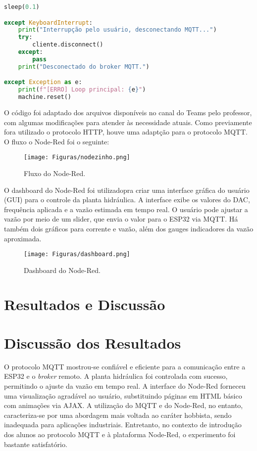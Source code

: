 \documentclass[a4paper,12pt]{article}
\begin{document}
\begin{lstlisting}[language=Python, caption={Código Principal do ESP32}, label={lst:codigoESP32}]
        sleep(0.1)

except KeyboardInterrupt:
    print("Interrupção pelo usuário, desconectando MQTT...")
    try:
        cliente.disconnect()
    except:
        pass
    print("Desconectado do broker MQTT.")

except Exception as e:
    print(f"[ERRO] Loop principal: {e}")
    machine.reset()
\end{lstlisting}

\newpage

O código foi adaptado dos arquivos disponíveis no canal do Teams pelo professor, com algumas modificações para atender às necessidade atuais. Como previamente fora utilizado o protocolo HTTP, houve uma adaptção para o protocolo MQTT. O fluxo o Node-Red foi o seguinte:
\begin{figure}
    \centering
    \texttt{[image: Figuras/nodezinho.png]}
    \caption{Fluxo do Node-Red.}
    \label{fig:fluxo}
\end{figure}

O dashboard do Node-Red foi utilizadopra criar uma interface gráfica do usuário (GUI) para o controle da planta hidráulica. A interface exibe os valores do DAC, frequência aplicada e a vazão estimada em tempo real. O usuário pode ajustar a vazão por meio de um slider, que envia o valor para o ESP32 via MQTT. Há também dois gráficos para corrente e vazão, além dos gauges indicadores da vazão aproximada.
\begin{figure}
    \centering
    \texttt{[image: Figuras/dashboard.png]}
    \caption{Dashboard do Node-Red.}
    \label{fig:dashboard}
\end{figure}


\newpage

\section{Resultados e Discussão}
\section*{Discussão dos Resultados}

O protocolo MQTT mostrou-se confiável e eficiente para a comunicação entre a ESP32 e o \textit{broker} remoto. A planta hidráulica foi controlada com sucesso, permitindo o ajuste da vazão em tempo real. A interface do Node-Red forneceu uma visualização agradável ao usuário, substituindo páginas em HTML básico com animações via AJAX. A utilização do MQTT e do Node-Red, no entanto, caracteriza-se por uma abordagem mais voltada ao caráter hobbista, sendo inadequada para aplicações industriais. Entretanto, no contexto de introdução dos alunos ao protocolo MQTT e à plataforma Node-Red, o experimento foi bastante satisfatório.
\end{document}
